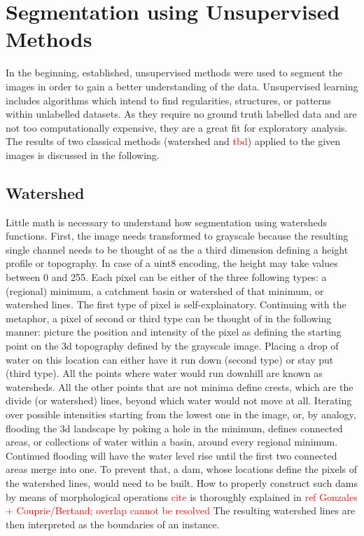 \section{Segmentation using Unsupervised Methods}
In the beginning, established, unsupervised methods were used to segment the images in order to gain a better understanding of the data. Unsupervised learning includes algorithms which intend to find regularities, structures, or patterns within unlabelled datasets. As they require no ground truth labelled data and are not too computationally expensive, they are a great fit for exploratory analysis. The results of two classical methods (watershed and \textcolor{red}{tbd}) applied to the given images is discussed in the following.  
\subsection{Watershed}
Little math is necessary to understand how segmentation using watersheds functions. First, the image needs transformed to grayscale because the resulting single channel needs to be thought of as the a third dimension defining a height profile or topography. In case of a uint8 encoding, the height may take values between 0 and 255. Each pixel can be either of the three following types: a (regional) minimum, a catchment basin or watershed of that minimum, or watershed lines. The first type of pixel is self-explainatory. Continuing with the metaphor, a pixel of second or third type can be thought of in the following manner: picture the position and intensity of the pixel as defining the starting point on the 3d topography defined by the grayscale image. Placing a drop of water on this location can either have it run down (second type) or stay put (third type). All the points where water would run downhill are known as watersheds. All the other points that are not minima define crests, which are the divide (or watershed) lines, beyond which water would not move at all. Iterating over possible intensities starting from the lowest one in the image, or, by analogy, flooding the 3d landscape by poking a hole in the minimum, defines connected areas, or collections of water within a basin, around every regional minimum. Continued flooding will have the water level rise until the first two connected areas merge into one. To prevent that, a dam, whose locations define the pixels of the watershed lines, would need to be built. How to properly construct such dams by means of morphological operations \textcolor{red}{cite} is thoroughly explained in \cite{Gonzalez1992, } \textcolor{red}{ref Gonzales + Couprie/Bertand;  overlap cannot be resolved} The resulting watershed lines are then interpreted as the boundaries of an instance.


